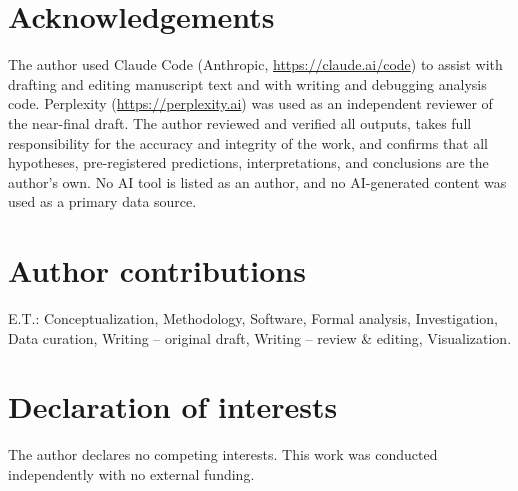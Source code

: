 \documentclass[11pt]{article}
\begin{document}
\section*{Acknowledgements}

The author used Claude Code (Anthropic, \url{https://claude.ai/code}) to
assist with drafting and editing manuscript text and with writing and
debugging analysis code. Perplexity (\url{https://perplexity.ai}) was
used as an independent reviewer of the near-final draft. The author
reviewed and verified all outputs, takes full responsibility for the
accuracy and integrity of the work, and confirms that all hypotheses,
pre-registered predictions, interpretations, and conclusions are the
author's own. No AI tool is listed as an author, and no AI-generated
content was used as a primary data source.

\section*{Author contributions}

E.T.: Conceptualization, Methodology, Software, Formal analysis,
Investigation, Data curation, Writing -- original draft, Writing --
review \& editing, Visualization.

\section*{Declaration of interests}

The author declares no competing interests.  This work was conducted
independently with no external funding.
\end{document}
